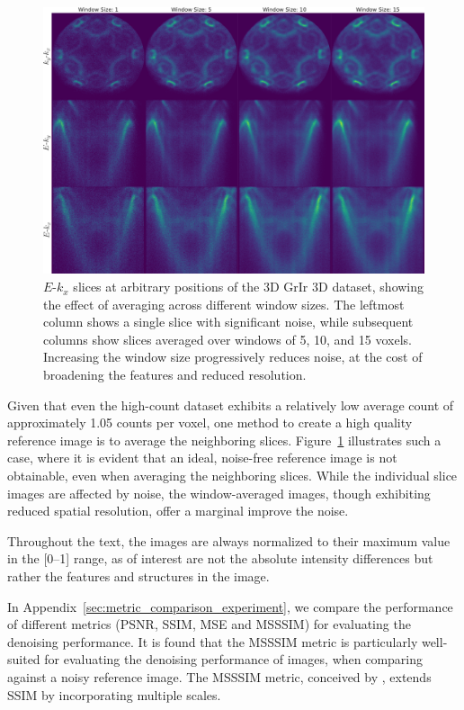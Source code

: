 \begin{figure}[h]
    \centering
    \includegraphics[width=1\linewidth]{images/slices.pdf}
    \caption{$E$-$k_x$ slices at arbitrary positions of the 3D \gls{GrIr} 3D dataset, showing the effect of averaging across different window sizes. The leftmost column shows a single slice with significant noise, while subsequent columns show slices averaged over windows of 5, 10, and 15 voxels. Increasing the window size progressively reduces noise, at the cost of broadening the features and reduced resolution.}
    \label{fig:slices}
\end{figure}

Given that even the high-count dataset exhibits a relatively low average count of approximately \num{1.05} counts per voxel, one method to create a high quality reference image is to average the neighboring slices. Figure~\ref{fig:slices} illustrates such a case, where it is evident that an ideal, noise-free reference image is not obtainable, even when averaging the neighboring slices. While the individual slice images are affected by noise, the window-averaged images, though exhibiting reduced spatial resolution, offer a marginal improve the noise.

Throughout the text, the images are always normalized to their maximum value in the [\numrange{0}{1}] range, as of interest are not the absolute intensity differences but rather the features and structures in the image.

In Appendix~\ref{sec:metric_comparison_experiment}, we compare the performance of different metrics (\gls{PSNR}, \gls{SSIM}, \gls{MSE} and \gls{MSSSIM}) for evaluating the denoising performance. It is found that the \gls{MSSSIM} metric is particularly well-suited for evaluating the denoising performance of images, when comparing against a noisy reference image. The \gls{MSSSIM} metric, conceived by \citeauthor{wangMultiscaleStructuralSimilarity2003} \cite{wangMultiscaleStructuralSimilarity2003}, extends SSIM by incorporating multiple scales. 

